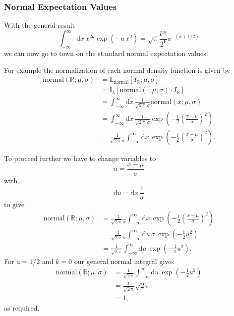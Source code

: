 \documentclass[
  letterpaper,
  DIV=11,
  numbers=noendperiod]{scrartcl}
\begin{document}
\hypertarget{normal-expectation-values}{%
\subsubsection{Normal Expectation
Values}\label{normal-expectation-values}}

With the general result \[
\int_{-\infty}^{\infty} \mathrm{d} x \,
x^{2 k} \exp \left( -a \, x^{2} \right)
=
\sqrt{\pi} \frac{k!!}{2^{k}} a^{-(k + 1/2)}
\] we can now go to town on the standard normal expectation values.

For example the normalization of each normal density function is given
by \begin{align*}
\mathrm{normal}(\mathbb{R}; \mu, \sigma)
&=
\mathbb{E}_{\mathrm{normal}}[ I_{\mathbb{R}} ; \mu, \sigma ]
\\
&=
\mathbb{I}_{\lambda}[\mathrm{normal}(\cdot; \mu, \sigma) \cdot I_{\mathbb{R}} ]
\\
&=
\int_{-\infty}^{\infty} \mathrm{d} x \, \frac{1}{\sqrt{2 \, \pi} \, \sigma}
\mathrm{normal}(x; \mu, \sigma)
\\
&=
\int_{-\infty}^{\infty} \mathrm{d} x \, \frac{1}{\sqrt{2 \, \pi} \, \sigma}
\exp\left( -\frac{1}{2} \left( \frac{x - \mu}{\sigma} \right)^{2} \right)
\\
&=
\frac{1}{\sqrt{2 \, \pi} \, \sigma} \int_{-\infty}^{\infty} \mathrm{d} x \,
\exp \left( -\frac{1}{2} \left( \frac{x - \mu}{\sigma} \right)^{2} \right).
\end{align*}

To proceed further we have to change variables to \[
u = \frac{x - \mu}{\sigma}
\] with \[
\mathrm{d} u = \mathrm{d} x \, \frac{1}{\sigma}
\] to give \begin{align*}
\mathrm{normal}(\mathbb{R}; \mu, \sigma)
&=
\frac{1}{\sqrt{2 \, \pi} \, \sigma} \int_{-\infty}^{\infty} \mathrm{d} x \,
\exp \left( -\frac{1}{2} \left( \frac{x - \mu}{\sigma} \right)^{2} \right)
\\
&=
\frac{1}{\sqrt{2 \, \pi} \, \sigma}
\int_{-\infty}^{\infty} \mathrm{d} u \, \sigma \,
\exp \left( -\frac{1}{2} u^{2} \right)
\\
&=
\frac{1}{\sqrt{2 \, \pi}}
\int_{-\infty}^{\infty} \mathrm{d} u \,
\exp \left( -\frac{1}{2} u^{2} \right).
\end{align*} For \(a = 1/2\) and \(k = 0\) our general normal integral
gives \begin{align*}
\mathrm{normal}(\mathbb{R}; \mu, \sigma)
&=
\frac{1}{\sqrt{2 \, \pi}}
\int_{-\infty}^{\infty} \mathrm{d} u \,
\exp \left( -\frac{1}{2} u^{2} \right)
\\
&=
\frac{1}{\sqrt{2 \, \pi}} \sqrt{2 \, \pi}
\\
&= 1,
\end{align*} as required.
\end{document}
